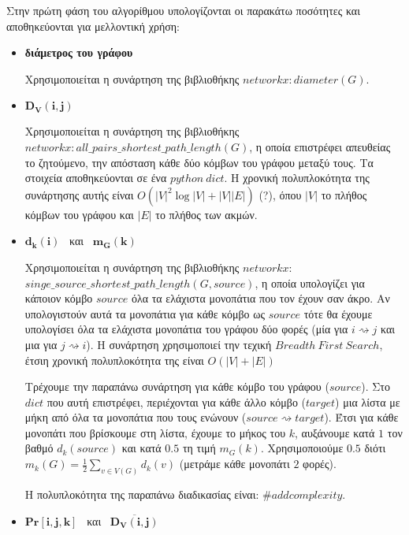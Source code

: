 \documentclass[12pt, letterpaper]{article}
\begin{document}
Στην πρώτη φάση του αλγορίθμου υπολογίζονται οι παρακάτω ποσότητες και αποθηκεύονται
για μελλοντική χρήση:
\begin{itemize}
    \item \textbf{διάμετρος του γράφου } 
    
    Χρησιμοποιείται η συνάρτηση της βιβλιοθήκης $networkx: diameter(G)$.
    
    \item  $\mathbf{D_V(i,j)}$
    
    Χρησιμοποιείται η συνάρτηση της βιβλιοθήκης $networkx: all\_pairs\_shortest\_path\_length(G)$,
    η οποία επιστρέφει απευθείας το ζητούμενο, την απόσταση κάθε δύο κόμβων του γράφου
    μεταξύ τους. Τα στοιχεία αποθηκεύονται σε ένα $python \ dict$. Η χρονική
    πολυπλοκότητα της συνάρτησης αυτής είναι $O(|V|^2\log |V| +|V||E|)$ (?), όπου 
    $|V|$ το πλήθος κόμβων του γράφου και $|E|$ το πλήθος των ακμών. 


    \item  $\mathbf{d_k(i)}$ \ και \ $\mathbf{m_G(k)}$
    
    Χρησιμοποιείται η συνάρτηση της βιβλιοθήκης $networkx:$ \\
    $ singe\_source\_shortest\_path\_length(G,source)$, η οποία υπολογίζει για κάποιον
    κόμβο $source$ όλα τα ελάχιστα μονοπάτια που τον έχουν σαν άκρο. Αν υπολογιστούν 
    αυτά τα μονοπάτια για κάθε κόμβο ως $source$ τότε θα έχουμε υπολογίσει
    όλα τα ελάχιστα μονοπάτια του γράφου δύο φορές (μία για $i \rightsquigarrow j$ και 
    μια για $j \rightsquigarrow i$). Η συνάρτηση χρησιμοποιεί την τεχική 
    $Breadth \ First \ Search$, έτσιη χρονική πολυπλοκότητα της είναι 
    $O(|V|+|E|)$

    Τρέχουμε την παραπάνω συνάρτηση για κάθε κόμβο του γράφου ($source$). Στο $dict$ που 
    αυτή επιστρέφει, περιέχονται για κάθε άλλο κόμβο  ($target$) μια λίστα με μήκη από όλα
    τα μονοπάτια που τους ενώνουν ($source \rightsquigarrow target$). Έτσι για κάθε 
    μονοπάτι που βρίσκουμε στη λίστα, έχουμε το μήκος του $k$, 
    αυξάνουμε κατά $1$ τον βαθμό $d_k(source)$ και κατά $0.5$ τη τιμή 
    $m_G(k)$. Χρησιμοποιούμε $0.5$ διότι $m_k(G) = \frac{1}{2} \sum_{v \in V (G)} d_k(v)$
    (μετράμε κάθε μονοπάτι $2$ φορές).

    Η  πολυπλοκότητα της παραπάνω διαδικασίας είναι: $\#add complexity$.

    \item $\mathbf{Pr[i,j,k]}$  \ και \   $\mathbf{\overline{D_V(i,j)}}$
    

\end{itemize}
\end{document}

